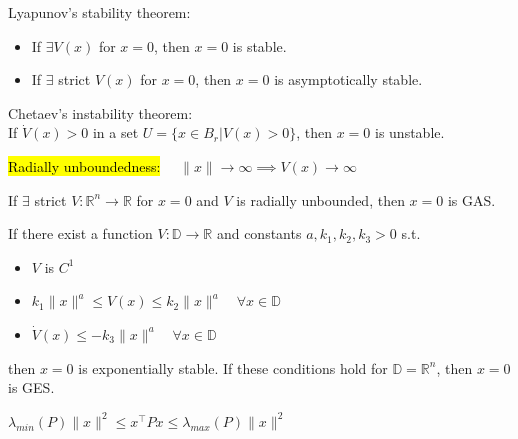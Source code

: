 \begin{tcolorbox}[colback=white, colframe=teal]
\begin{theorem}
    Lyapunov's stability theorem:
    \begin{itemize}[topsep=0pt]
        \item If $\exists V(x)$ for $x=0$, then $x=0$ is stable.
        \item If $\exists$ strict $V(x)$ for $x=0$, then $x=0$ is asymptotically stable.
    \end{itemize}
\end{theorem}
\end{tcolorbox}

\begin{theorem}
    Chetaev's instability theorem:\\
    If $\dot{V}(x) > 0$ in a set $U = \{x \in B_r | V(x) > 0\}$, then $x=0$ is unstable.
\end{theorem}

\begin{tcolorbox}[colback=white, colframe=teal]
\begin{definition}
    \hl{Radially unboundedness:} $\quad \| x\| \rightarrow \infty \implies V(x) \rightarrow \infty$
\end{definition}
\end{tcolorbox}

\begin{theorem}
    If $\exists$ strict  $V : \mathbb{R}^n \rightarrow \mathbb{R}$ for $x=0$ and
    $V$ is radially unbounded,
    then $x=0$ is GAS.
\end{theorem}

\begin{theorem}
    If there exist a function $V : \mathbb{D} \rightarrow \mathbb{R}$ and constants $a, k_1, k_2, k_3 > 0$ s.t.
    \begin{itemize}[topsep=0pt]
        \item $V$ is $C^1$
        \item $k_{1}\|x\|^{a} \leq V(x) \leq k_{2}\|x\|^{a} \quad \forall x \in \mathbb{D}$
        \item $\dot{V}(x) \leq-k_{3}\|x\|^{a} \quad \forall x \in \mathbb{D}$
    \end{itemize}
    then $x=0$ is exponentially stable. If these conditions hold for $\mathbb{D} = \mathbb{R}^n$, then $x=0$ is GES. 
\end{theorem}

\begin{remark}
    $\lambda_{min}(P) \|x\|^2 \leq x^{\top} P x \leq \lambda_{max}(P) \|x\|^2$
\end{remark}

